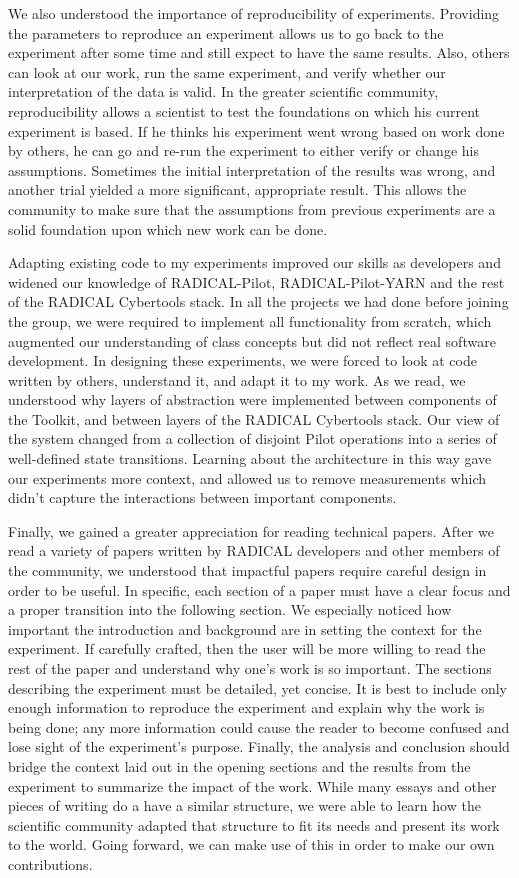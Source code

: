 \documentclass[]{article}
\begin{document}
	We also understood the importance of reproducibility of experiments. Providing the parameters to reproduce an experiment allows us to go back to the experiment after some time and still expect to have the same results. Also, others can look at our work, run the same experiment, and verify whether our interpretation of the data is valid. In the greater scientific community, reproducibility allows a scientist to test the foundations on which his current experiment is based. If he thinks his experiment went wrong based on work done by others, he can go and re-run the experiment to either verify or change his assumptions. Sometimes the initial interpretation of the results was wrong, and another trial yielded a more significant, appropriate result. This allows the community to make sure that the assumptions from previous experiments are a solid foundation upon which new work can be done.

	Adapting existing code to my experiments improved our skills as developers and widened our knowledge of RADICAL-Pilot, RADICAL-Pilot-YARN and the rest of the RADICAL Cybertools stack. In all the projects we had done before joining the group, we were required to implement all functionality from scratch, which augmented our understanding of class concepts but did not reflect real software development. In designing these experiments, we were forced to look at code written by others, understand it, and adapt it to my work. As we read, we understood why layers of abstraction were implemented between components of the Toolkit, and between layers of the RADICAL Cybertools stack. Our view of the system changed from a collection of disjoint Pilot operations into a series of well-defined state transitions. Learning about the architecture in this way gave our experiments more context, and allowed us to remove measurements which didn't capture the interactions between important components. 


	Finally, we gained a greater appreciation for reading technical papers. After we read a variety of papers written by RADICAL developers and other members of the community, we understood that impactful papers require careful design in order to be useful. In specific, each section of a paper must have a clear focus and a proper transition into the following section. We especially noticed how important the introduction and background are in setting the context for the experiment. If carefully crafted, then the user will be more willing to read the rest of the paper and understand why one's work is so important. The sections describing the experiment must be detailed, yet concise. It is best to include only enough information to reproduce the experiment and explain why the work is being done; any more information could cause the reader to become confused and lose sight of the experiment's purpose. Finally, the analysis and conclusion should bridge the context laid out in the opening sections and the results from the experiment to summarize the impact of the work. While many essays and other pieces of writing do a have a similar structure, we were able to learn how the scientific community adapted that structure to fit its needs and present its work to the world. Going forward, we can make use of this in order to make our own contributions.



{}
		
\end{document}
